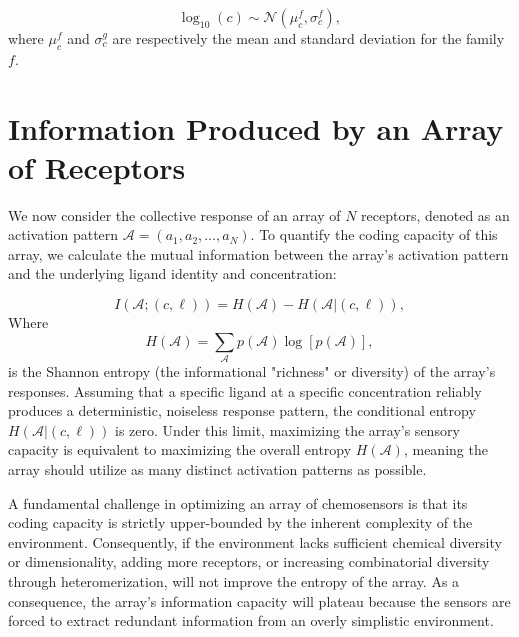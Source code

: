 \documentclass[
    reprint, %
    amsmath,
    amssymb,
    aps,
    prb,      %
    floatfix
]{revtex4-2}
\begin{document}
$$
\log_{10}(c) \sim \mathcal{N}(\mu_c^f, \sigma_c^f),
$$
where $\mu_c^f$ and $\sigma_c^g$ are respectively the mean and standard deviation for the family $f$.

\section{Information Produced by an Array of Receptors}

We now consider the collective response of an array of $N$ receptors, denoted as an activation pattern $\mathcal{A} = (a_1, a_2, \dots, a_N)$. To quantify the coding capacity of this array, we calculate the mutual information between the array's activation pattern and the underlying ligand identity and concentration:

$$
I(\mathcal{A};(c,\ell)) = H(\mathcal{A}) - H(\mathcal{A} | (c,\ell)),
$$
Where 
$$
H(\mathcal{A}) = \sum_\mathcal{A} p(\mathcal{A}) \log[p(\mathcal{A})],
$$
is the Shannon entropy (the informational "richness" or diversity) of the array's responses.
Assuming that a specific ligand at a specific concentration reliably produces a deterministic, noiseless response pattern, the conditional entropy $H(\mathcal{A} | (c,\ell))$ is zero. Under this limit, maximizing the array's sensory capacity is equivalent to maximizing the overall entropy $H(\mathcal{A})$, meaning the array should utilize as many distinct activation patterns as possible.



A fundamental challenge in optimizing an array of chemosensors is that its coding capacity is strictly upper-bounded by the inherent complexity of the environment. Consequently, if the environment lacks sufficient chemical diversity or dimensionality, adding more receptors, or increasing combinatorial diversity through heteromerization, will not improve the entropy of the array. As a consequence, the array's information capacity will plateau because the sensors are forced to extract redundant information from an overly simplistic environment.
\end{document}

